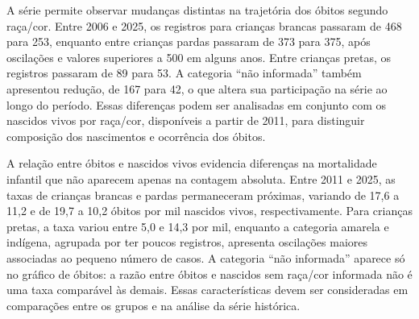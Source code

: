 
A série permite observar mudanças distintas na trajetória dos óbitos segundo raça/cor. Entre 2006 e 2025, os registros para crianças brancas passaram de 468 para 253, enquanto entre crianças pardas passaram de 373 para 375, após oscilações e valores superiores a 500 em alguns anos. Entre crianças pretas, os registros passaram de 89 para 53. A categoria “não informada” também apresentou redução, de 167 para 42, o que altera sua participação na série ao longo do período. Essas diferenças podem ser analisadas em conjunto com os nascidos vivos por raça/cor, disponíveis a partir de 2011, para distinguir composição dos nascimentos e ocorrência dos óbitos.


A relação entre óbitos e nascidos vivos evidencia diferenças na mortalidade infantil que não aparecem apenas na contagem absoluta. Entre 2011 e 2025, as taxas de crianças brancas e pardas permaneceram próximas, variando de 17,6 a 11,2 e de 19,7 a 10,2 óbitos por mil nascidos vivos, respectivamente. Para crianças pretas, a taxa variou entre 5,0 e 14,3 por mil, enquanto a categoria amarela e indígena, agrupada por ter poucos registros, apresenta oscilações maiores associadas ao pequeno número de casos. A categoria “não informada” aparece só no gráfico de óbitos: a razão entre óbitos e nascidos sem raça/cor informada não é uma taxa comparável às demais. Essas características devem ser consideradas em comparações entre os grupos e na análise da série histórica.


